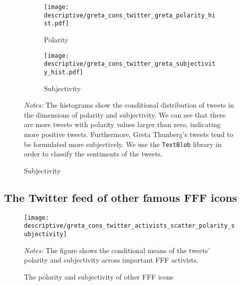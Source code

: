 \documentclass[11pt, a4paper]{article} %
\begin{document}
\begin{figure}[H]\centering
	\caption{Conditional sentiment analysis of Greta Thunberg's tweets}
	\begin{subfigure}[h]{0.48\linewidth}\centering\caption{Polarity}
		\texttt{[image: descriptive/greta\_cons\_twitter\_greta\_polarity\_hist.pdf]}
	\end{subfigure}
	\begin{subfigure}[h]{0.48\linewidth}\centering\caption{Subjectivity}
		\texttt{[image: descriptive/greta\_cons\_twitter\_greta\_subjectivity\_hist.pdf]}
	\end{subfigure}
	\begin{minipage}{\linewidth}
		\scriptsize{\emph{Notes:} The histograms show the conditional distribution of tweets in the dimensions of polarity and subjectivity. We can see that there are more tweets with polarity values larger than zero, indicating more positive tweets. Furthermore, Greta Thunberg's tweets tend to be formulated more subjectively. We use the \texttt{TextBlob} library in order to classify the sentiments of the tweets.}
	\end{minipage}
\end{figure}



\newpage
\subsection{The Twitter feed of other famous FFF icons}

\begin{figure}[H]\centering
	\caption{The polarity and subjectivity of other FFF icons}
	\texttt{[image: descriptive/greta\_cons\_twitter\_activists\_scatter\_polarity\_subjectivity]}
	\begin{minipage}{\linewidth}
		\scriptsize{\emph{Notes:} The figure shows the conditional means of the tweets' polarity and subjectivity across important FFF activists.}
	\end{minipage}
\end{figure}
\end{document}
